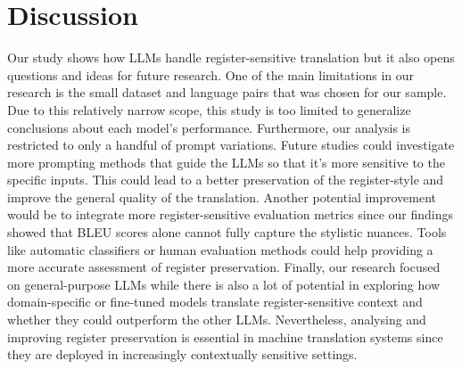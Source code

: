 \documentclass[fleqn,moreauthors,10pt]{ds_report}
\begin{document}
		
		\section*{Discussion}
		
Our study shows how LLMs handle register-sensitive translation but it also opens questions and ideas for future research. One of the main limitations in our research is the small dataset and language pairs that was chosen for our sample. Due to this relatively narrow scope, this study is too limited to generalize conclusions about each model's performance. Furthermore, our analysis is restricted to only a handful of prompt variations. Future studies could investigate more prompting methods that guide the LLMs so that it's more sensitive to the specific inputs. This could lead to a better preservation of the register-style and improve the general quality of the translation. Another potential improvement would be to integrate more register-sensitive evaluation metrics since our findings showed that BLEU scores alone cannot fully capture the stylistic nuances. Tools like automatic classifiers or human evaluation methods could help providing a more accurate assessment of register preservation. 
Finally, our research focused on general-purpose LLMs while there is also a lot of potential in exploring how domain-specific or fine-tuned models translate register-sensitive context and whether they could outperform the other LLMs. Nevertheless, analysing and improving register preservation is essential in machine translation systems since they are deployed in increasingly contextually sensitive settings.
		
		

		
		
		
		
\end{document}
